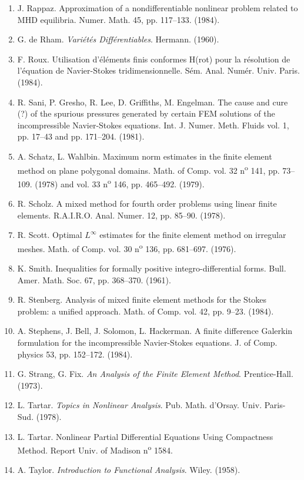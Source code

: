 \begin{enumerate}
\item {}J. Rappaz. Approximation of a nondifferentiable nonlinear problem related to MHD equilibria. Numer. Math. 45, pp. 117--133. (1984).
\item G. de Rham. \textit{Variétés Différentiables}. Hermann. (1960).
\item F. Roux. Utilisation d'éléments finis conformes H(rot) pour la résolution de l'équation de Navier-Stokes tridimensionnelle. Sém. Anal. Numér. Univ. Paris. (1984).
\item R. Sani, P. Gresho, R. Lee, D. Griffiths, M. Engelman. The cause and cure (?) of the spurious pressures generated by certain FEM solutions of the incompressible Navier-Stokes equations. Int. J. Numer. Meth. Fluids vol. 1, pp. 17--43 and pp. 171--204. (1981).
\item A. Schatz, L. Wahlbin. Maximum norm estimates in the finite element method on plane polygonal domains. Math. of Comp. vol. 32 n\textsuperscript{o} 141, pp. 73--109. (1978) and vol. 33 n\textsuperscript{o} 146, pp. 465--492. (1979).
\item {}R. Scholz. A mixed method for fourth order problems using linear finite elements. R.A.I.R.O. Anal. Numer. 12, pp. 85--90. (1978).
\item R. Scott. Optimal $L^{\infty}$ estimates for the finite element method on irregular meshes. Math. of Comp. vol. 30 n\textsuperscript{o} 136, pp. 681--697. (1976).
\item K. Smith. Inequalities for formally positive integro-differential forms. Bull. Amer. Math. Soc. 67, pp. 368--370. (1961).
\item R. Stenberg. Analysis of mixed finite element methods for the Stokes problem: a unified approach. Math. of Comp. vol. 42, pp. 9--23. (1984).
\item A. Stephens, J. Bell, J. Solomon, L. Hackerman. A finite difference Galerkin formulation for the incompressible Navier-Stokes equations. J. of Comp. physics 53, pp. 152--172. (1984).
\item G. Strang, G. Fix. \textit{An Analysis of the Finite Element Method}. Prentice-Hall. (1973).
\item L. Tartar. \textit{Topics in Nonlinear Analysis}. Pub. Math. d'Orsay. Univ. Paris-Sud. (1978).
\item L. Tartar. Nonlinear Partial Differential Equations Using Compactness Method. Report Univ. of Madison n\textsuperscript{o} 1584.
\item A. Taylor. \textit{Introduction to Functional Analysis}. Wiley. (1958).

\end{enumerate}
